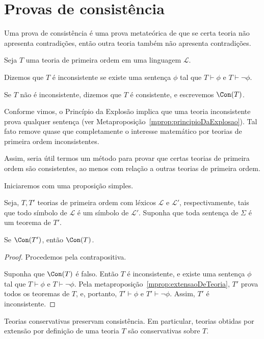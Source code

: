 \section{Provas de consistência}\label{sec:provasDeConsistencia}
Uma prova de consistência é uma prova metateórica de que se certa teoria não apresenta contradições, então outra teoria também não apresenta contradições.

\begin{metadefinition}
    Seja $T$ uma teoria de primeira ordem em uma linguagem $\mathcal L$.

    Dizemos que $T$ é inconsistente se existe uma sentença $\phi$ tal que $T\vdash \phi$ e $T\vdash \neg \phi$.

    Se $T$ não é inconsistente, dizemos que $T$ é consistente, e escrevemos $\Con(T)$.
\end{metadefinition}

Conforme vimos, o Princípio da Explosão implica que uma teoria inconsistente prova qualquer sentença (ver Metaproposição~\ref{mprop:principioDaExplosao}).
Tal fato remove quase que completamente o interesse matemático por teorias de primeira ordem inconsistentes.

Assim, seria útil termos um método para provar que certas teorias de primeira ordem são consistentes, ao menos com relação a outras teorias de primeira ordem.

Iniciaremos com uma proposição simples.

\begin{metaproposition}\label{mprop:consistenciaDeTeoriasMaisFracas}
    Seja, $T, T'$ teorias de primeira ordem com léxicos $\mathcal L$ e $\mathcal L'$, respectivamente, tais que todo símbolo de $\mathcal L$ é um símbolo de $\mathcal L'$.
    Suponha que toda sentença de $\Sigma$ é um teorema de $T'$.
    
    Se $\Con(T')$, então $\Con(T)$.
\end{metaproposition}

\begin{proof}
    Procedemos pela contrapositiva.

    Suponha que $\Con(T)$ é falso.
    Então $T$ é inconsistente, e existe uma sentença $\phi$ tal que $T\vdash \phi$ e $T\vdash \neg \phi$.
    Pela metaproposição~\ref{mprop:extensaoDeTeoria}, $T'$ prova todos os teoremas de $T$, e, portanto, $T'\vdash \phi$ e $T'\vdash \neg \phi$.
    Assim, $T'$ é inconsistente.
\end{proof}

Teorias conservativas preservam consistência.
Em particular, teorias obtidas por extensão por definição de uma teoria $T$ são conservativas sobre $T$.

